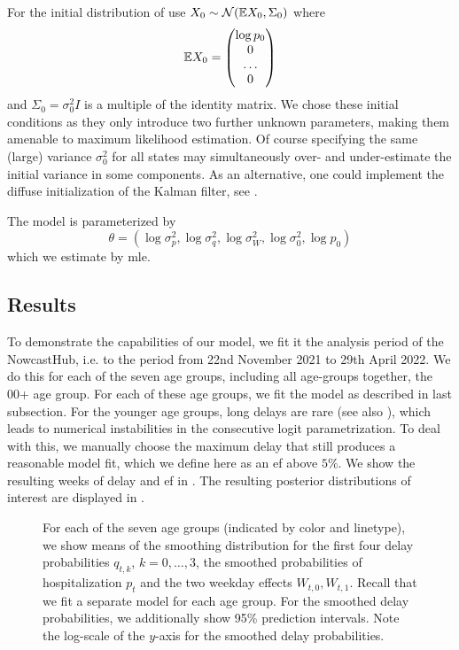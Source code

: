 For the initial distribution of use $X_{0} \sim \mathcal N(\mathbb E X_{0}, \Sigma_0)$ where 
$$
    \mathbb E X_{0} = \begin{pmatrix}
        \log p_{0} \\
        0 \\
        \dots \\
        0
    \end{pmatrix}
$$
and $\Sigma_{0} = \sigma^{2}_0 I$ is a multiple of the identity matrix. We chose these initial conditions as they only introduce two further unknown parameters, making them amenable to maximum likelihood estimation. Of course specifying the same (large) variance $\sigma^{2}_0$ for all states may simultaneously over- and under-estimate the initial variance in some components. As an alternative, one could implement the diffuse initialization of the Kalman filter, see \citep{Ansley1985Estimation,Koopman1997Exact}.

The model is parameterized by 
$$
    \theta = \left( \log \sigma^{2}_{p}, \log \sigma_{q}^{2}, \log \sigma^{2}_W, \log \sigma^{2}_0, \log p_{0} \right)
$$
which we estimate by \acrshort{mle}. 





\subsection{Results}
To demonstrate the capabilities of our model, we fit it the analysis period of the NowcastHub, i.e. to the period from 22nd November 2021 to 29th April 2022. We do this for each of the seven age groups, including all age-groups together, the 00+ age group. For each of these age groups, we fit the model as described in last subsection. For the younger age groups, long delays are rare (see also ), which leads to numerical instabilities in the consecutive logit parametrization. To deal with this, we manually choose the maximum delay that still produces a reasonable model fit, which we define here as an \acrshort{ef} above $5\%$. We show the resulting weeks of delay and \acrshort{ef} in . The resulting posterior distributions of interest are displayed in . 

\begin{figure}
    \resizebox{\textwidth}{!}{%
    }
    \caption{For each of the seven age groups (indicated by color and linetype), we show means of the smoothing distribution for the first four delay probabilities $q_{t,k}$, $k = 0,\dots, 3$, the smoothed probabilities of hospitalization $p_t$ and the two weekday effects $W_{t,0}, W_{t,1}$. Recall that we fit a separate model for each age group. For the smoothed delay probabilities, we additionally show 95\% prediction intervals. Note the log-scale of the $y$-axis for the smoothed delay probabilities. %
    }
    \label{fig:hospitalization_showcase_results}
\end{figure}


